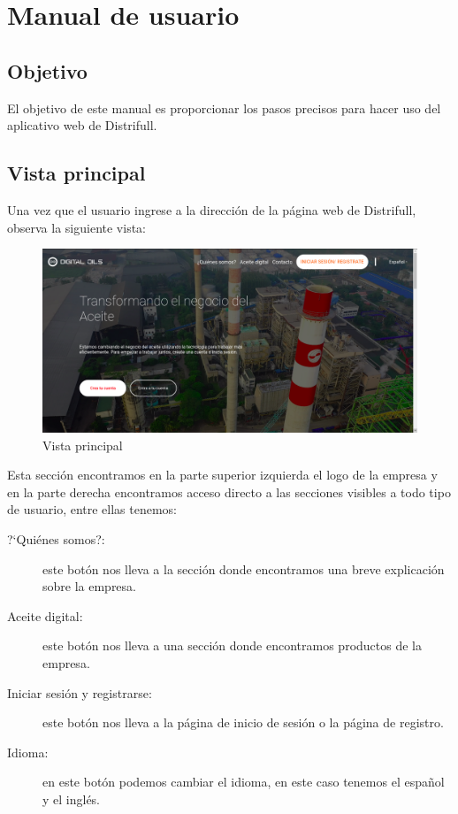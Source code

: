 \chapter{Manual de usuario}
\section{Objetivo}
El objetivo de este manual es proporcionar los pasos precisos para hacer uso del aplicativo web de Distrifull. 

\section{Vista principal}
Una vez que el usuario ingrese a la direcci\'on de la p\'agina web de Distrifull, observa la siguiente vista:
\begin{figure}[h!]
	\centering
	\includegraphics[width=0.9\linewidth, height=0.3\textheight]{imagenes/inicioOne}
	\caption[Primera parte del inicio.]{Vista principal}
	\label{fig:inicioone}
\end{figure}

Esta secci\'on encontramos en la parte superior izquierda el logo de la empresa y en la parte derecha encontramos acceso directo a las secciones visibles a todo tipo de usuario, entre ellas tenemos:
\begin{description}
	\item[ ?`Qui\'enes somos?: ] este bot\'on  nos lleva a la secci\'on donde encontramos una breve explicaci\'on sobre la empresa.
	\item[Aceite digital: ] este bot\'on nos lleva a una secci\'on donde encontramos productos de la empresa.
	\item[Iniciar sesi\'on y registrarse: ] este bot\'on nos lleva a la p\'agina de inicio de sesi\'on o la p\'agina de registro.
	\item[Idioma: ] en este bot\'on podemos cambiar el idioma, en este caso tenemos el espa\~nol y el ingl\'es. 
\end{description}
